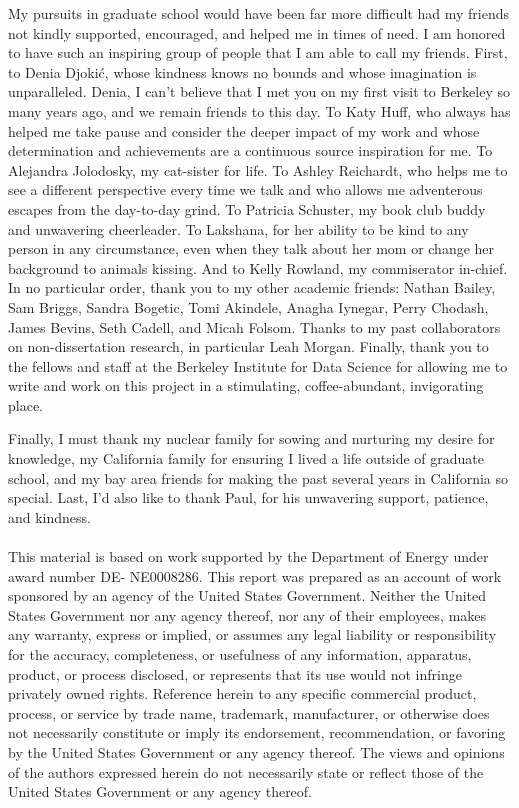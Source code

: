 \begin{acknowledgements}
My pursuits in graduate school would have been far more difficult had my friends
not kindly supported, encouraged, and helped me in times of need. I am honored
to have such an inspiring group of people that I am able to call my friends.
First, to Denia Djoki\'c, whose kindness knows no bounds and whose imagination is
unparalleled. Denia, I can't believe
that I met you on my first visit to Berkeley so many years ago, and we remain
friends to this day. To Katy Huff, who always has helped me
take pause and consider the deeper impact of my work and whose determination and
achievements are a continuous source inspiration for me.
To Alejandra Jolodosky, my cat-sister for life.
To Ashley Reichardt, who
helps me to see a different perspective every time we talk and who allows
me adventerous escapes from the day-to-day grind.
To Patricia Schuster, my
book club buddy and unwavering cheerleader. To Lakshana, for her
ability to be kind to any person in any circumstance,
even when they talk about her mom or change her background to animals kissing.
And to Kelly Rowland, my
commiserator in-chief. In no particular order,
thank you to my other academic friends: Nathan Bailey,
Sam Briggs, Sandra Bogetic, Tomi Akindele,
Anagha Iynegar, Perry Chodash, James Bevins, Seth Cadell,
and Micah Folsom.
Thanks to my past collaborators on non-dissertation research, in
particular Leah Morgan. Finally, thank you to the fellows and staff at the
Berkeley Institute for Data Science for allowing me to write and work on this
project in a stimulating, coffee-abundant, invigorating place.

Finally, I must thank my nuclear
family for sowing and nurturing my desire for
knowledge, my California family for
ensuring I lived a life outside of graduate
school, and my bay area friends for making the past several years in California
so special.
Last, I'd also like to thank Paul, for his unwavering
support, patience, and kindness. \\ \\

\footnotesize{This material is based on work supported by the Department of Energy under award
number DE- NE0008286. This report was prepared as an account of work sponsored
by an agency of the United States Government. Neither the United States
Government nor any agency thereof, nor any of their employees, makes any
warranty, express or implied, or assumes any legal liability or responsibility
for the accuracy, completeness, or usefulness of any information, apparatus,
product, or process disclosed, or represents that its use would not infringe
privately owned rights. Reference herein to any specific commercial product,
process, or service by trade name, trademark, manufacturer, or otherwise does
not necessarily constitute or imply its endorsement, recommendation, or favoring
by the United States Government or any agency thereof. The views and opinions of
the authors expressed herein do not necessarily state or reflect those of the
United States Government or any agency thereof.}

\end{acknowledgements}
